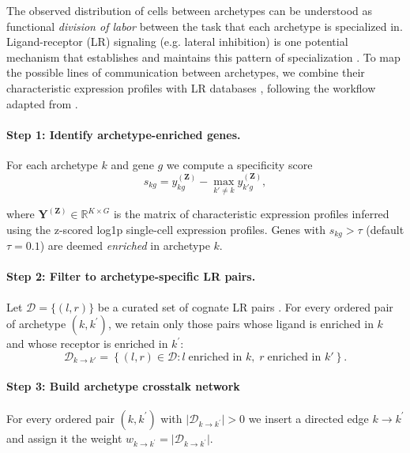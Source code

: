 \documentclass{article}
\begin{document}
The observed distribution of cells between archetypes can be understood as functional \emph{division of labor} between the task that each archetype is specialized in. Ligand-receptor (LR) signaling (e.g. lateral inhibition) is one potential mechanism that establishes and maintains this pattern of specialization \autocite{adlerDivisionOfLabor2023}. To map the possible lines of communication between archetypes, we combine their characteristic expression profiles with LR databases \autocite{liana2022,lianaPlus2024}, following the workflow adapted from \textcite{adlerDivisionOfLabor2023}.

\paragraph{Step 1: Identify archetype-enriched genes.}
For each archetype $k$ and gene $g$ we compute a specificity score\begin{equation}
    s_{kg}=y^{(\mathbf{Z})}_{kg}-\max_{k'\neq k}y^{(\mathbf{Z})}_{k'g},
\end{equation}

where $\mathbf{Y}^{(\mathbf{Z})}\in\mathbb{R}^{K\times G}$ is the matrix of characteristic expression profiles inferred using the z-scored log1p single-cell expression profiles. Genes with $s_{kg}>\tau$ (default $\tau=0.1$) are deemed \emph{enriched} in archetype $k$.

\paragraph{Step 2: Filter to archetype-specific LR pairs.}
Let $\mathcal{D}=\{(l,r)\}$ be a curated set of cognate LR pairs \autocite{liana2022,lianaPlus2024}. For every ordered pair of archetype $(k, k^\prime)$, we retain only those pairs whose ligand is enriched in $k$ and whose receptor is enriched in $k^\prime$:\begin{equation}
    \mathcal{D}_{k\to k'}=\left\{(l,r)\in\mathcal{D}:
    l\;\text{enriched in }k,\; r\;\text{enriched in }k'\right\}.
\end{equation}

\paragraph{Step 3: Build archetype crosstalk network}
For every ordered pair $(k,k^\prime)$ with $\lvert \mathcal{D}_{k\to k^\prime} \rvert>0$ we insert a directed edge $k \to k^\prime$ and assign it the weight $w_{k\to k^\prime}=\lvert \mathcal{D}_{k \to k^\prime} \rvert$.
\end{document}
